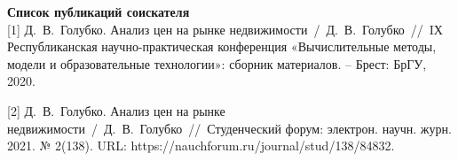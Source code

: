 
\renewcommand{\bibsection}{\sectioncentered*{Cписок использованных источников}}
\pagebreak %

\nocite{*}



\newpage

\textbf{Список публикаций соискателя}\\

[1] Д.~В.~Голубко. Анализ цен на рынке недвижимости~/~Д.~В.~Голубко~//~IХ Республиканская научно-практическая
конференция «Вычислительные методы, модели и образовательные технологии»: сборник материалов. – Брест: БрГУ, 2020.

[2] Д.~В.~Голубко. Анализ цен на рынке недвижимости~/~Д.~В.~Голубко~//~Студенческий форум: электрон. научн. журн. 2021. № 2(138).\linebreak
URL: https://nauchforum.ru/journal/stud/138/84832.
\newpage
